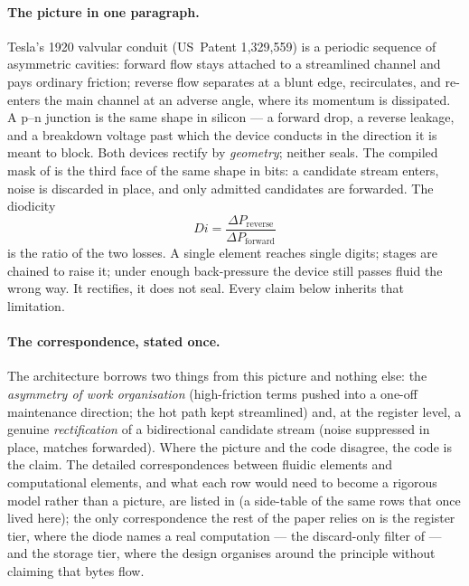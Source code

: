 \documentclass[11pt,letterpaper]{article}
\begin{document}
\paragraph{The picture in one paragraph.}
Tesla's 1920 valvular conduit (US~Patent 1{,}329{,}559) \cite{tesla1920} is a
periodic sequence of asymmetric cavities: forward flow stays attached to a
streamlined channel and pays ordinary friction; reverse flow separates at a
blunt edge, recirculates, and re-enters the main channel at an adverse
angle, where its momentum is dissipated. A p--n junction is the same shape
in silicon --- a forward drop, a reverse leakage, and a breakdown voltage
past which the device conducts in the direction it is meant to block.
Both devices rectify by \emph{geometry}; neither seals. The compiled mask
of  is the third face of the same shape in bits: a
candidate stream enters, noise is discarded in place, and only admitted
candidates are forwarded. The diodicity
\begin{equation}
\label{eq:di}
Di = \frac{\Delta P_{\text{reverse}}}{\Delta P_{\text{forward}}}
\end{equation}
is the ratio of the two losses. A single element reaches single digits;
stages are chained to raise it; under enough back-pressure the device
still passes fluid the wrong way. It rectifies, it does not seal. Every
claim below inherits that limitation.

\paragraph{The correspondence, stated once.}
The architecture borrows two things from this picture and nothing else:
the \emph{asymmetry of work organisation} (high-friction terms pushed into
a one-off maintenance direction; the hot path kept streamlined) and, at
the register level, a genuine \emph{rectification} of a bidirectional
candidate stream (noise suppressed in place, matches forwarded). Where
the picture and the code disagree, the code is the claim. The detailed
correspondences between fluidic elements and computational elements, and
what each row would need to become a rigorous model rather than a
picture, are listed in  (a side-table
of the same rows that once lived here); the only correspondence the rest
of the paper relies on is the register tier, where the diode names a real
computation --- the discard-only filter of  ---
and the storage tier, where the design organises around the principle
without claiming that bytes flow.
\end{document}
